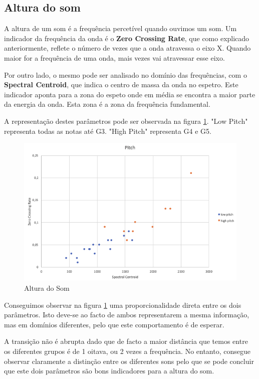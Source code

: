\subsection{Altura do som}

A altura de um som é a frequência percetível quando ouvimos um som.
Um indicador da frequência da onda é o \textbf{Zero Crossing Rate}, que como explicado anteriormente, reflete o número de vezes que a onda atravessa o eixo X.
Quando maior for a frequência de uma onda, mais vezes vai atravessar esse eixo.

Por outro lado, o mesmo pode ser analisado no domínio das frequências, com o \textbf{Spectral Centroid}, que indica o centro de massa da onda no espetro.
Este indicador aponta para a zona do espeto onde em média se encontra a maior parte da energia da onda.
Esta zona é a zona da frequência fundamental.

A representação destes parâmetros pode ser observada na figura \ref{fig:4}.
"Low Pitch" representa todas as notas até G3. "High Pitch" representa G4 e G5.

\begin{figure}[H]
    \centering
    \includegraphics[width=.8\linewidth]{figs/pitch_1.png}
    \caption{Altura do Som}
    \label{fig:4}
\end{figure}

Conseguimos observar na figura \ref{fig:4} uma proporcionalidade direta entre os dois parâmetros.
Isto deve-se ao facto de ambos representarem a mesma informação, mas em domínios diferentes, pelo que este comportamento é de esperar.

A transição não é abrupta dado que de facto a maior distância que temos entre os diferentes grupos é de 1 oitava, ou 2 vezes a frequência.
No entanto, consegue observar claramente a distinção entre os diferentes sons pelo que se pode concluir que este dois parâmetros são bons indicadores para a altura do som.


